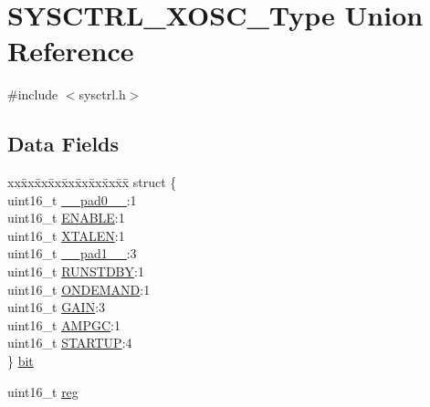 \hypertarget{union_s_y_s_c_t_r_l___x_o_s_c___type}{}\section{S\+Y\+S\+C\+T\+R\+L\+\_\+\+X\+O\+S\+C\+\_\+\+Type Union Reference}
\label{union_s_y_s_c_t_r_l___x_o_s_c___type}


{\ttfamily \#include $<$sysctrl.\+h$>$}

\subsection*{Data Fields}
\begin{DoxyCompactItemize}
\item 
\begin{tabbing}
xx\=xx\=xx\=xx\=xx\=xx\=xx\=xx\=xx\=\kill
struct \{\\
\>uint16\_t \mbox{\hyperlink{union_s_y_s_c_t_r_l___x_o_s_c___type_a77132c2c26a75f5b8751b235cda23828}{\_\_pad0\_\_}}:1\\
\>uint16\_t \mbox{\hyperlink{union_s_y_s_c_t_r_l___x_o_s_c___type_aec203800ebef356dc04f3e8986a824d8}{ENABLE}}:1\\
\>uint16\_t \mbox{\hyperlink{union_s_y_s_c_t_r_l___x_o_s_c___type_a213212644ef27e91b6ed7d8f995db6bf}{XTALEN}}:1\\
\>uint16\_t \mbox{\hyperlink{union_s_y_s_c_t_r_l___x_o_s_c___type_ab72e3a1f2f7db8695c60c658f5a0f11a}{\_\_pad1\_\_}}:3\\
\>uint16\_t \mbox{\hyperlink{union_s_y_s_c_t_r_l___x_o_s_c___type_a0a98954fc108f309f3232355e809617b}{RUNSTDBY}}:1\\
\>uint16\_t \mbox{\hyperlink{union_s_y_s_c_t_r_l___x_o_s_c___type_a93f43f8127aa6a27551de4ddad9cd47e}{ONDEMAND}}:1\\
\>uint16\_t \mbox{\hyperlink{union_s_y_s_c_t_r_l___x_o_s_c___type_af8050124da1730d0de52b84f67b0b94c}{GAIN}}:3\\
\>uint16\_t \mbox{\hyperlink{union_s_y_s_c_t_r_l___x_o_s_c___type_aaf1bee118e8d8f16617e7aa146f335bc}{AMPGC}}:1\\
\>uint16\_t \mbox{\hyperlink{union_s_y_s_c_t_r_l___x_o_s_c___type_a33b016c487940487fff564ff0940cd5a}{STARTUP}}:4\\
\} \mbox{\hyperlink{union_s_y_s_c_t_r_l___x_o_s_c___type_a542e0845ce1d8012111c4bdaeef16949}{bit}}\\

\end{tabbing}\item 
uint16\+\_\+t \mbox{\hyperlink{union_s_y_s_c_t_r_l___x_o_s_c___type_a11760f5020019f4aa8cb02e694f7cc44}{reg}}
\end{DoxyCompactItemize}


